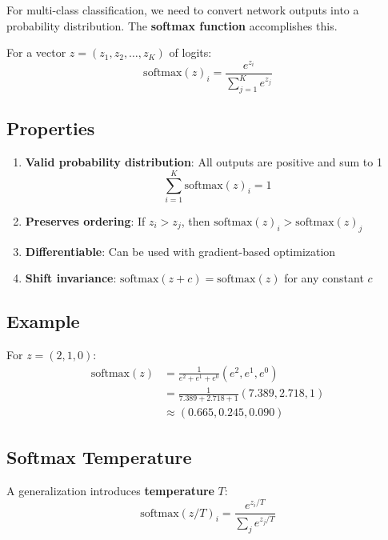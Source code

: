 For multi-class classification, we need to convert network outputs into a probability distribution. The \textbf{softmax function} accomplishes this.

\begin{definition}[Softmax]
For a vector $z = (z_1, z_2, \ldots, z_K)$ of logits:
\[
\boxed{\text{softmax}(z)_i = \frac{e^{z_i}}{\sum_{j=1}^{K} e^{z_j}}}
\]
\end{definition}

\subsection{Properties}

\begin{enumerate}
    \item \textbf{Valid probability distribution}: All outputs are positive and sum to 1
    \[
    \sum_{i=1}^{K} \text{softmax}(z)_i = 1
    \]
    
    \item \textbf{Preserves ordering}: If $z_i > z_j$, then $\text{softmax}(z)_i > \text{softmax}(z)_j$
    
    \item \textbf{Differentiable}: Can be used with gradient-based optimization
    
    \item \textbf{Shift invariance}: $\text{softmax}(z + c) = \text{softmax}(z)$ for any constant $c$
\end{enumerate}

\subsection{Example}

For $z = (2, 1, 0)$:
\begin{align}
\text{softmax}(z) &= \frac{1}{e^2 + e^1 + e^0}(e^2, e^1, e^0) \\
&= \frac{1}{7.389 + 2.718 + 1}(7.389, 2.718, 1) \\
&\approx (0.665, 0.245, 0.090)
\end{align}

\subsection{Softmax Temperature}

A generalization introduces \textbf{temperature} $T$:
\[
\text{softmax}(z/T)_i = \frac{e^{z_i/T}}{\sum_{j} e^{z_j/T}}
\]

